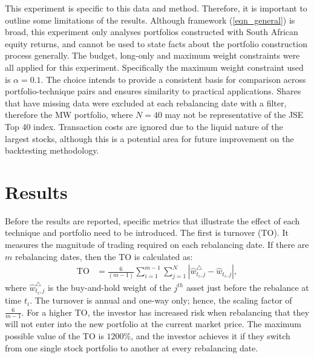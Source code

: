 \documentclass[a4paper,11pt,nocenter,bold,noupper,headcount]{mythesis}
\theoremstyle{plain}
\theoremstyle{definition}
\begin{document}
This experiment is specific to this data and method. Therefore, it is important to outline some limitations of the results. Although framework (\ref{eqn_general}) is broad, this experiment only analyses portfolios constructed with South African equity returns, and cannot be used to state facts about the portfolio construction process generally. The budget, long-only and maximum weight constraints were all applied for this experiment. Specifically the maximum weight constraint used is $\alpha = 0.1$. The choice intends to provide a consistent basis for comparison across portfolio-technique pairs and ensures similarity to practical applications. Shares that have missing data were excluded at each rebalancing date with a filter, therefore the MW portfolio, where $N = 40$ may not be representative of the JSE Top 40 index. Transaction costs are ignored due to the liquid nature of the largest stocks, although this is a potential area for future improvement on the backtesting methodology.

\section{Results}

Before the results are reported, specific metrics that illustrate the effect of each technique and portfolio need to be introduced. The first is turnover (TO). It measures the magnitude of trading required on each rebalancing date. If there are $m$ rebalancing dates, then the TO is calculated as:
\begin{align}
\text{TO} & = \frac{6}{(m - 1)} \sum_{i = 1}^{m - 1} \sum_{j =1}^{N} |\hat{w}_{t_i, j}^\triangle - \hat{w}_{t_i, j}|,
\end{align}
where $\hat{w}_{t_i, j}^\triangle$ is the buy-and-hold weight of the $j^{th}$ asset just before the rebalance at time $t_i$. The turnover is annual and one-way only; hence, the scaling factor of $\frac{6}{m-1}$. For a higher TO, the investor has increased risk when rebalancing that they will not enter into the new portfolio at the current market price. The maximum possible value of the TO is $1200\%$, and the investor achieves it if they switch from one single stock portfolio to another at every rebalancing date.
\end{document}
